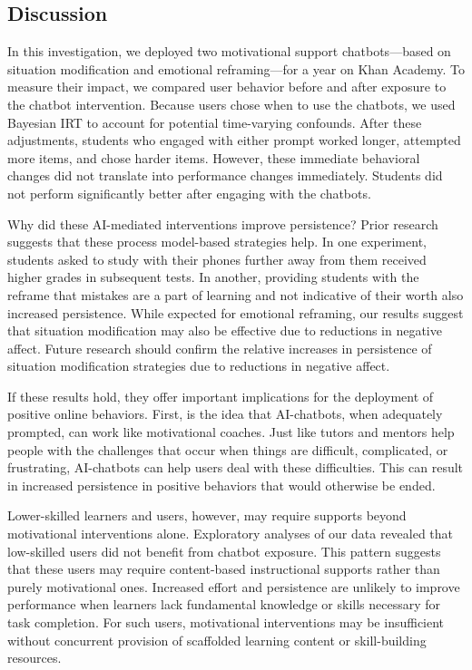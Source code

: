 \documentclass[11pt]{report}
\begin{document}
\begin{mainf}
\section*{Discussion} 

In this investigation, we deployed two motivational support chatbots---based on situation modification and emotional reframing---for a year on Khan Academy. 
To measure their impact, we compared user behavior before and after exposure to the chatbot intervention.
Because users chose when to use the chatbots, we used Bayesian IRT to account for potential time-varying confounds.
After these adjustments, students who engaged with either prompt worked longer, attempted more items, and chose harder items.
However, these immediate behavioral changes did not translate into performance changes immediately.
Students did not perform significantly better after engaging with the chatbots.

Why did these AI-mediated interventions improve persistence?
Prior research suggests that these process model-based strategies help.
In one experiment, students asked to study with their phones further away from them received higher grades in subsequent tests.
In another, providing students with the reframe that mistakes are a part of learning and not indicative of their worth also increased persistence. 
While expected for emotional reframing, our results suggest that situation modification may also be effective due to reductions in negative affect.
Future research should confirm the relative increases in persistence of situation modification strategies due to reductions in negative affect.

If these results hold, they offer important implications for the deployment of positive online behaviors.
First, is the idea that AI-chatbots, when adequately prompted, can work like motivational coaches.
Just like tutors and mentors help people with the challenges that occur when things are difficult, complicated, or frustrating, AI-chatbots can help users deal with these difficulties.
This can result in increased persistence in positive behaviors that would otherwise be ended.

Lower-skilled learners and users, however, may require supports beyond motivational interventions alone. Exploratory analyses of our data revealed that low-skilled users did not benefit from chatbot exposure. This pattern suggests that these users may require content-based instructional supports rather than purely motivational ones. Increased effort and persistence are unlikely to improve performance when learners lack fundamental knowledge or skills necessary for task completion. For such users, motivational interventions may be insufficient without concurrent provision of scaffolded learning content or skill-building resources.



\end{mainf}
\end{document}
